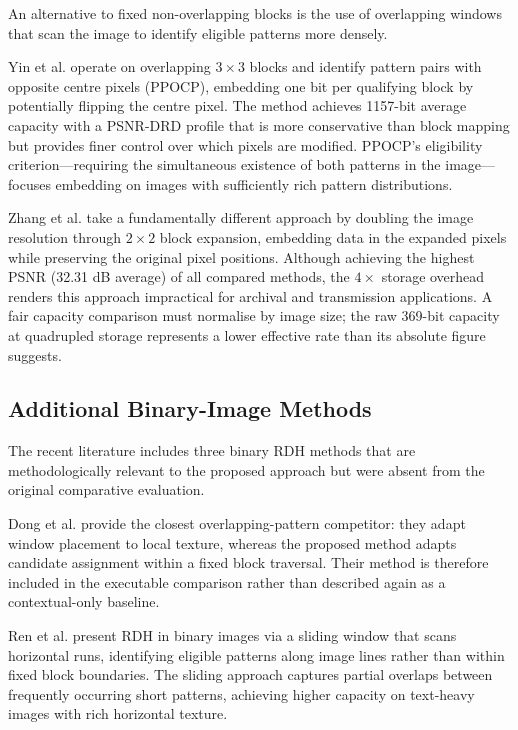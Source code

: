 \documentclass[a4paper,fleqn]{cas-dc}
\begin{document}
An alternative to fixed non-overlapping blocks is the use of overlapping windows that scan the image to identify eligible patterns more densely.

Yin et al. \cite{Yin2020PPOCP} operate on overlapping $3\times3$ blocks and identify pattern pairs with opposite centre pixels (PPOCP), embedding one bit per qualifying block by potentially flipping the centre pixel. The method achieves 1157-bit average capacity with a PSNR-DRD profile that is more conservative than block mapping but provides finer control over which pixels are modified. PPOCP's eligibility criterion---requiring the simultaneous existence of both patterns in the image---focuses embedding on images with sufficiently rich pattern distributions.

Zhang et al. \cite{Zhang2022Magnification} take a fundamentally different approach by doubling the image resolution through $2\times2$ block expansion, embedding data in the expanded pixels while preserving the original pixel positions. Although achieving the highest PSNR (32.31 dB average) of all compared methods, the $4\times$ storage overhead renders this approach impractical for archival and transmission applications. A fair capacity comparison must normalise by image size; the raw 369-bit capacity at quadrupled storage represents a lower effective rate than its absolute figure suggests.

\subsection{Additional Binary-Image Methods}

The recent literature includes three binary RDH methods that are methodologically relevant to the proposed approach but were absent from the original comparative evaluation.

Dong et al. \cite{Dong2020Adaptive} provide the closest overlapping-pattern
competitor: they adapt window placement to local texture, whereas the proposed
method adapts candidate assignment within a fixed block traversal. Their
method is therefore included in the executable comparison rather than
described again as a contextual-only baseline.

Ren et al. \cite{Ren2022Sliding} present RDH in binary images via a sliding window that scans horizontal runs, identifying eligible patterns along image lines rather than within fixed block boundaries. The sliding approach captures partial overlaps between frequently occurring short patterns, achieving higher capacity on text-heavy images with rich horizontal texture.
\end{document}
